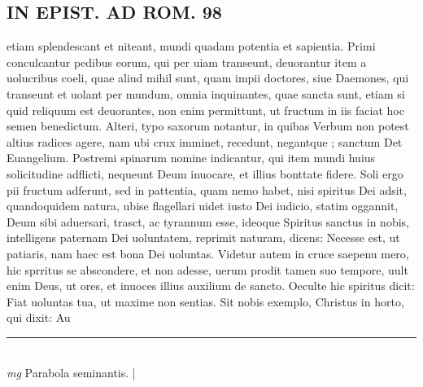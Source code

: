 \documentclass{article}
\begin{document}
\begin{pages}
\section*{IN EPIST. AD ROM.  98 }
\marginpar{[ p.]}\pstart etiam splendescant et niteant, mundi quadam potentia et sapientia. Primi conculcantur pedibus eorum, qui per uiam transeunt, deuorantur item a uolucribus coeli, quae aliud mihil sunt, quam impii doctores, siue Daemones, qui transeunt et uolant per mundum, omnia inquinantes, quae sancta sunt, etiam si quid reliquum est deuorantes, non enim permittunt, ut fructum in iis faciat hoc semen benedictum. Alteri, typo saxorum notantur, in quibas Verbum non potest altius radices agere, nam ubi crux imminet, recedunt, negantque ; sanctum Det Euangelium. Postremi spinarum nomine indicantur, qui item mundi huius solicitudine adflicti, nequeunt Deum inuocare, et illius bonttate fidere. Soli ergo pii fructum adferunt, sed in pattentia, quam nemo habet, nisi spiritus Dei adsit, quandoquidem natura, ubise flagellari uidet iusto Dei iudicio, statim oggannit, Deum sibi aduersari, trasct, ac tyrannum esse, ideoque Spiritus sanctus in nobis, intelligens paternam Dei uoluntatem, reprimit naturam, dicens: Necesse est, ut patiaris, nam haec est bona Dei uoluntas. Videtur autem in cruce saepenu mero, hic sprritus se abscondere, et non adesse, uerum prodit tamen suo tempore, uult enim Deus, ut ores, et inuoces illius auxilium de sancto. Oeculte hic spiritus dicit: Fiat uoluntas tua, ut maxime non sentias.  Sit nobis exemplo, Christus in horto, qui dixit: Au\pend
\vspace{0.5cm}\noindent
\vspace{0.2cm}\rule{1cm}{0.2pt}\\ 
\hspace{0.2cm}\textit{mg}
\footnotesize Parabola seminantis. 
\normalsize| 

\end{pages}
\end{document}
